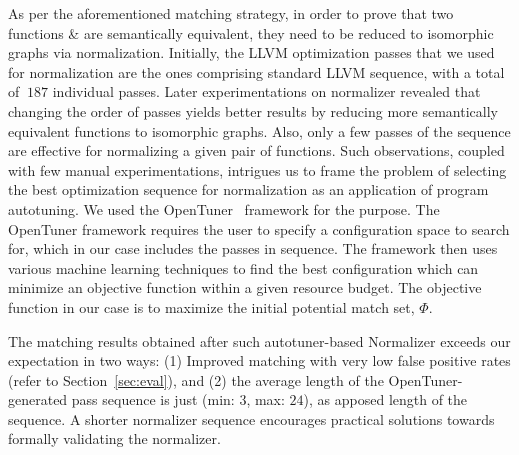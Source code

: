 As per the aforementioned matching strategy, in order to prove that two
functions \F \& \FP are semantically equivalent, they need to be reduced to
isomorphic graphs via normalization. Initially, the LLVM optimization passes
that we used for normalization are the ones comprising standard LLVM  sequence, with a total of $~187$ individual passes. Later
  experimentations on normalizer revealed that changing the order of passes
  yields better results by reducing more semantically equivalent functions to isomorphic graphs. Also,
  only a few passes of the  sequence are effective for normalizing a
  given pair of functions.  Such observations, coupled with few manual
  experimentations, intrigues us to frame the problem of selecting the best
  optimization sequence for normalization as an application of program
  autotuning. We used the OpenTuner~\cite{opentuner2014} framework for
  the purpose. The OpenTuner framework requires the user to specify a configuration space
  to search for, which in our case includes the passes in  sequence. The 
  framework then uses various machine learning techniques to  find the best configuration which
  can minimize an objective function within a given resource budget. The objective function in our 
  case is to maximize the initial potential match set, $\Phi$.  
  
  The matching results obtained after such autotuner-based Normalizer
  exceeds our expectation in two ways: (1) Improved matching with very low false 
  positive rates (refer to Section~\ref{sec:eval}), and (2) the average length of the OpenTuner-generated pass sequence 
  is just \avgPassLength (min: $3$, max: $24$), as apposed length of the  sequence. A shorter normalizer
  sequence encourages practical solutions towards formally validating the normalizer. 
   

